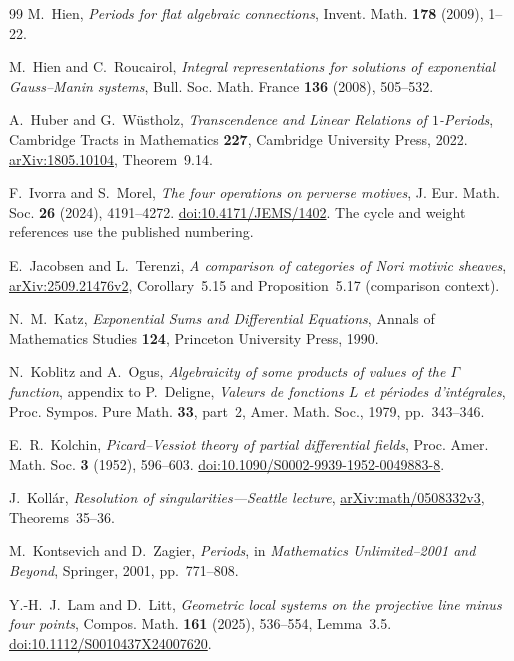 \documentclass[11pt]{article}
\numberwithin{equation}{section}
\theoremstyle{definition}
\theoremstyle{remark}
\begin{document}
\begin{thebibliography}{99}
M.~Hien, \emph{Periods for flat algebraic connections},
Invent. Math. \textbf{178} (2009), 1--22.

M.~Hien and C.~Roucairol,
\emph{Integral representations for solutions of exponential Gauss--Manin systems},
Bull. Soc. Math. France \textbf{136} (2008), 505--532.

A.~Huber and G.~W\"ustholz, \emph{Transcendence and Linear Relations of
$1$-Periods}, Cambridge Tracts in Mathematics \textbf{227}, Cambridge
University Press, 2022. \href{https://arxiv.org/abs/1805.10104}{arXiv:1805.10104},
Theorem~9.14.

F.~Ivorra and S.~Morel, \emph{The four operations on perverse motives},
J. Eur. Math. Soc. \textbf{26} (2024), 4191--4272.
\href{https://doi.org/10.4171/JEMS/1402}{doi:10.4171/JEMS/1402}.
The cycle and weight references use the published numbering.

E.~Jacobsen and L.~Terenzi, \emph{A comparison of categories of Nori
motivic sheaves}, \href{https://arxiv.org/abs/2509.21476v2}{arXiv:2509.21476v2},
Corollary~5.15 and Proposition~5.17 (comparison context).

N.~M.~Katz,
\emph{Exponential Sums and Differential Equations},
Annals of Mathematics Studies \textbf{124}, Princeton University Press, 1990.

N.~Koblitz and A.~Ogus,
\emph{Algebraicity of some products of values of the $\Gamma$ function},
appendix to P.~Deligne, \emph{Valeurs de fonctions $L$ et p\'eriodes d'int\'egrales},
Proc. Sympos. Pure Math. \textbf{33}, part~2, Amer. Math. Soc., 1979,
pp.~343--346.

E.~R.~Kolchin, \emph{Picard--Vessiot theory of partial differential fields},
Proc. Amer. Math. Soc. \textbf{3} (1952), 596--603.
\href{https://doi.org/10.1090/S0002-9939-1952-0049883-8}{doi:10.1090/S0002-9939-1952-0049883-8}.

J.~Koll\'ar, \emph{Resolution of singularities---Seattle lecture},
\href{https://arxiv.org/abs/math/0508332v3}{arXiv:math/0508332v3},
Theorems~35--36.

M.~Kontsevich and D.~Zagier,
\emph{Periods},
in \emph{Mathematics Unlimited--2001 and Beyond}, Springer, 2001, pp.~771--808.

Y.-H.~J.~Lam and D.~Litt, \emph{Geometric local systems on the projective
line minus four points}, Compos. Math. \textbf{161} (2025), 536--554,
Lemma~3.5. \href{https://doi.org/10.1112/S0010437X24007620}{doi:10.1112/S0010437X24007620}.


\end{thebibliography}
\end{document}
